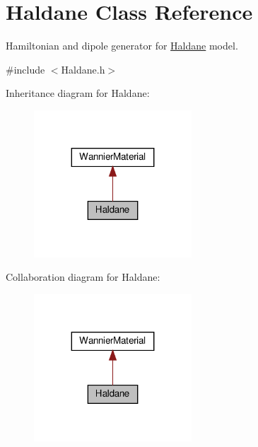 \hypertarget{class_haldane}{}\section{Haldane Class Reference}
\label{class_haldane}


Hamiltonian and dipole generator for \hyperlink{class_haldane}{Haldane} model.  




{\ttfamily \#include $<$Haldane.\+h$>$}



Inheritance diagram for Haldane\+:\nopagebreak
\begin{figure}[H]
\begin{center}
\leavevmode
\includegraphics[width=167pt]{class_haldane__inherit__graph}
\end{center}
\end{figure}


Collaboration diagram for Haldane\+:\nopagebreak
\begin{figure}[H]
\begin{center}
\leavevmode
\includegraphics[width=167pt]{class_haldane__coll__graph}
\end{center}
\end{figure}
